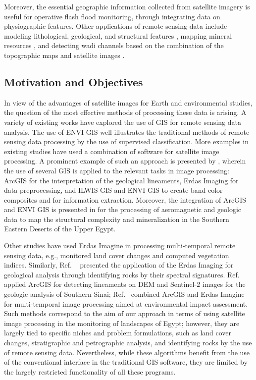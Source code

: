 \documentclass[information,article,accept,pdftex,moreauthors]{Definitions/mdpi}
\begin{document}
{Moreover}, the essential geographic information collected from satellite imagery is useful for operative flash flood monitoring{, through integrating} data on physiographic features. Other applications of remote sensing data include modeling lithological, geological, and structural features \cite{BESHR2021999}, mapping mineral resources \cite{Kamal}, and detecting wadi channels based on the combination of the topographic maps and satellite images \cite{Moubark}. 

\subsection{{Motivation and Objectives}}

{In view of the advantages of satellite images for Earth and environmental studies, the question of the most effective methods of processing these data is arising. A variety of existing works have explored the use of GIS for remote sensing data analysis. The use of ENVI GIS} \cite{ABDELSADEK2022815,GHEBREZGABHER201637,ABDELMALIK2020263} {well illustrates the traditional methods of remote sensing data processing by the use of supervised classification. More examples in existing studies have used a combination of software for satellite image processing. A prominent example of such an approach is presented by} \cite{KAMEL2016343}, {wherein the use of several GIS is applied to the relevant tasks in image processing: ArcGIS for the interpretation of the geological lineaments, Erdas Imaging for data preprocessing, and ILWIS GIS and ENVI GIS to create band color composites and for information extraction. Moreover, the integration of ArcGIS and ENVI GIS is presented in} \cite{ELDOSOUKY20201008,GABR202211} {for the processing of aeromagnetic and geologic data to map the structural complexity and mineralization in the Southern Eastern Deserts of the Upper Egypt.}

{Other studies have used Erdas Imagine in processing multi-temporal remote sensing data, e.g.,} \cite{BAKR2010592,NASSERMOHAMEDEID202066} {monitored land cover changes and computed vegetation indices. Similarly,} Ref. %
~\cite{ALIBIK2022113} {presented the application of the Erdas Imaging for geological analysis through identifying rocks by their spectral signatures.} Ref. \cite{ALIBIK2022593} {applied ArcGIS for detecting lineaments on DEM and Sentinel-2 images for the geologic analysis of Southern Sinai;} Ref.~\cite{HOSSEN2016951} {combined ArcGIS and Erdas Imagine for multi-temporal image processing aimed at environmental impact assessment. Such methods correspond to the aim of our approach in terms of using satellite image processing in the monitoring of landscapes of Egypt; however, they are largely tied to specific niches and problem formulations, such as land cover changes, stratigraphic and petrographic analysis, and identifying rocks by the use of remote sensing data. Nevertheless, while these algorithms benefit from the use of the conventional interface in the traditional GIS software, they are limited by the largely restricted functionality of all these programs. }
\end{document}
